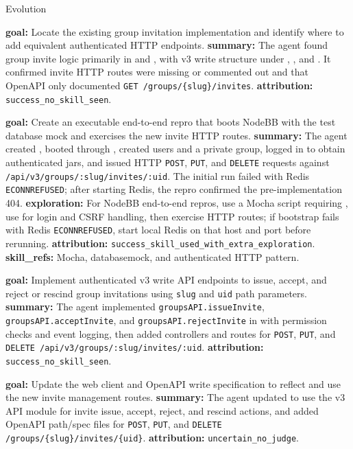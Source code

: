 \documentclass{llmxive}
\providecommand{\svpromptheading}[1]{\par\smallskip\noindent{\sffamily\bfseries#1}\par}
\providecommand{\svpartsep}{\par\medskip\noindent{\leaders\hbox{\rule[0.45ex]{5pt}{0.35pt}\hspace{3pt}}\hfill\kern0pt}\par\medskip}
\begin{document}
\begin{svpromptbox}{Evolution}
\svpartsep
\svpromptheading{Distilled Subtasks}
\begin{enumerate}[label=\textnormal{[\arabic*]}, leftmargin=*]
    \item \textbf{goal:} Locate the existing group invitation implementation and identify where to add equivalent authenticated HTTP endpoints. \textbf{summary:} The agent found group invite logic primarily in  and , with v3 write structure under , , and . It confirmed invite HTTP routes were missing or commented out and that OpenAPI only documented \texttt{GET /groups/\{slug\}/invites}. \textbf{attribution:} \texttt{success\_no\_skill\_seen}.
    \item \textbf{goal:} Create an executable end-to-end repro that boots NodeBB with the test database mock and exercises the new invite HTTP routes. \textbf{summary:} The agent created , booted through , created users and a private group, logged in to obtain authenticated jars, and issued HTTP \texttt{POST}, \texttt{PUT}, and \texttt{DELETE} requests against \texttt{/api/v3/groups/:slug/invites/:uid}. The initial run failed with Redis \texttt{ECONNREFUSED}; after starting Redis, the repro confirmed the pre-implementation 404. \textbf{exploration:} For NodeBB end-to-end repros, use a Mocha script requiring , use  for login and CSRF handling, then exercise HTTP routes; if bootstrap fails with Redis \texttt{ECONNREFUSED}, start local Redis on that host and port before rerunning. \textbf{attribution:} \texttt{success\_skill\_used\_with\_extra\_exploration}. \textbf{skill\_refs:}  Mocha, databasemock, and authenticated HTTP pattern.
    \item \textbf{goal:} Implement authenticated v3 write API endpoints to issue, accept, and reject or rescind group invitations using \texttt{slug} and \texttt{uid} path parameters. \textbf{summary:} The agent implemented \texttt{groupsAPI.issueInvite}, \texttt{groupsAPI.acceptInvite}, and \texttt{groupsAPI.rejectInvite} in  with permission checks and event logging, then added controllers and routes for \texttt{POST}, \texttt{PUT}, and \texttt{DELETE /api/v3/groups/:slug/invites/:uid}. \textbf{attribution:} \texttt{success\_no\_skill\_seen}.
    \item \textbf{goal:} Update the web client and OpenAPI write specification to reflect and use the new invite management routes. \textbf{summary:} The agent updated  to use the v3 API module for invite issue, accept, reject, and rescind actions, and added OpenAPI path/spec files for \texttt{POST}, \texttt{PUT}, and \texttt{DELETE /groups/\{slug\}/invites/\{uid\}}. \textbf{attribution:} \texttt{uncertain\_no\_judge}.

\end{enumerate}
\end{svpromptbox}
\end{document}
